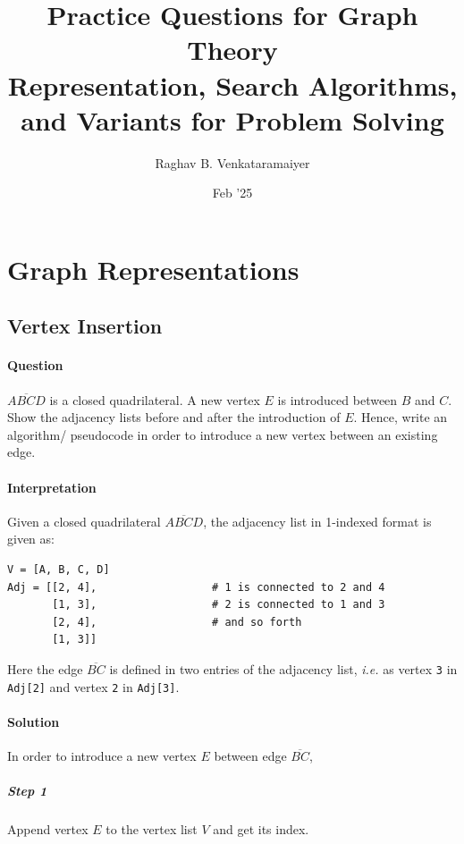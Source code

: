 \documentclass[11pt]{article}
\author{Raghav B. Venkataramaiyer}
\date{Feb '25}
\title{Practice Questions for Graph Theory\\\medskip
\large Representation, Search Algorithms, and Variants for Problem Solving}
\begin{document}
\maketitle

\section{Graph Representations}
\label{sec:org6cfe53f}

\subsection{Vertex Insertion}
\label{sec:org0ddad32}
\paragraph*{Question}
\label{sec:org0454258}

\(\overline{\mathit{ABCD}}\) is a closed quadrilateral.
A new vertex \(E\) is introduced between \(B\) and \(C\).
Show the adjacency lists before and after the
introduction of \(E\).  Hence, write an algorithm/
pseudocode in order to introduce a new vertex between
an existing edge.

\paragraph*{Interpretation}
\label{sec:orgf312fc8}
Given a closed quadrilateral
\(\overline{\mathit{ABCD}}\), the adjacency list in
1-indexed format is given as:

\begin{verbatim}
V = [A, B, C, D]
Adj = [[2, 4],                  # 1 is connected to 2 and 4
       [1, 3],                  # 2 is connected to 1 and 3
       [2, 4],                  # and so forth
       [1, 3]]
\end{verbatim}

Here the edge \(\overline{\mathit{BC}}\) is defined in
two entries of the adjacency list, \emph{i.e.} as vertex \texttt{3}
in \texttt{Adj[2]} and vertex \texttt{2} in \texttt{Adj[3]}.

\paragraph*{Solution}
\label{sec:org8c697a3}

In order to introduce a new vertex \(E\) between edge
\(\overline{\mathit{BC}}\),

\subparagraph*{Step 1}
\label{sec:org277e327}
Append vertex \(E\) to the vertex list \(V\) and get its
index.
\end{document}

